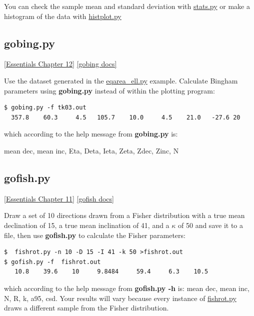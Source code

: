 \documentclass[11pt]{book}
\begin{document}
{{{{You can check the sample mean and standard deviation with \href{#stats.py}{stats.py} or make a histogram of the data with \href{#hisplot.py}{histplot.py}




\subsection{gobing.py}
 \href{http://earthref.org/MAGIC/books/Tauxe/Essentials/WebBook3ch11.html#ch11}{[Essentials Chapter 12]}
 \href{https://github.com/PmagPy/PmagPy/blob/master/programs/gobing.py}{[gobing docs]}

Use the dataset generated in the \href{#eqarea_ell.py}{eqarea\_ell.py} example.   Calculate Bingham parameters using {\bf gobing.py}  instead of within the plotting program:

\begin{verbatim}
$ gobing.py -f tk03.out
  357.8    60.3     4.5   105.7    10.0     4.5    21.0   -27.6 20
\end{verbatim}

\noindent  which according to the help message from {\bf gobing.py} is:

mean dec, mean inc, Eta, Deta, Ieta, Zeta, Zdec, Zinc, N


\subsection{gofish.py}
 \href{http://earthref.org/MAGIC/books/Tauxe/Essentials/WebBook3ch11.html#ch11}{[Essentials Chapter 11]}
 \href{https://github.com/PmagPy/PmagPy/blob/master/programs/gofish.py}{[gofish docs]}

 Draw a set of 10 directions drawn  from a Fisher distribution with a true mean declination of 15, a true mean inclination of 41, and a $\kappa$ of  50 and save it to a file, then use {\bf gofish.py} to calculate the Fisher parameters:

\begin{verbatim}
$  fishrot.py -n 10 -D 15 -I 41 -k 50 >fishrot.out
$ gofish.py -f  fishrot.out
   10.8    39.6    10     9.8484     59.4     6.3    10.5
\end{verbatim}

\noindent     which according to the help message from {\bf gofish.py -h} is:   mean dec, mean inc, N, R, k, a95, csd.  Your results will vary because every instance of \href{#fishrot.py}{fishrot.py} draws a different sample from the Fisher distribution.

}}}}
\end{document}

